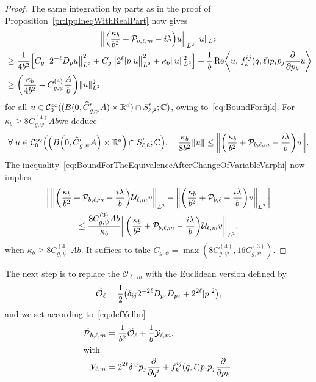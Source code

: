 \documentclass[10pt]{amsart}
\theoremstyle{definition}\newtheorem{defi}[theo]{Definition}\newtheorem{rema}[theo]{Remark}\newtheorem{exam}[theo]{Example}\newtheorem{exem}[theo]{Example}\newtheorem{nota}[theo]{Notation}
\newcommand{\C}{\mathbb{C}}
\newcommand{\R}{\mathbb{R}}
\newcommand{\clC}{\mathcal{C}}
\newcommand{\clY}{\mathcal{Y}}
\newcommand{\clO}{\mathcal{O}}
\newcommand{\clP}{\mathcal{P}}
\newcommand{\clU}{\mathcal{U}}
\DeclareMathOperator{\Ree}{Re}
\let\oldtilde\tilde
\renewcommand*{\tilde}[1]{\mathchoice{\widetilde{#1}}{\widetilde{#1}}{\oldtilde{#1}}{\oldtilde{#1}}}
\let\oldhat\hat
\renewcommand*{\hat}[1]{\mathchoice{\widehat{#1}}{\widehat{#1}}{\oldhat{#1}}{\oldhat{#1}}}
\let\oldforall\forall
\renewcommand*{\forall}{\mathrel{\oldforall}}
\let\originalleft\left
\let\originalright\right
\renewcommand{\left}{\mathopen{}\mathclose\bgroup\originalleft}
\renewcommand{\right}{\aftergroup\egroup\originalright}
\newcounter{setofstep}
\newcounter{step}[setofstep]
\begin{document}
\begin{proof}
The same integration by parts as in the proof of Proposition~\ref{pr:IppIneqWithRealPart} now gives
\begin{multline*}
\left\| \left(\frac{\kappa_{b}}{b^{2}}+\clP_{b,\ell,m} - i\lambda\right) u \right\|_{L^{2}} \|u\|_{L^{2}}\\
\begin{aligned}
&\geq \frac{1}{4b^{2}}
\left[C_g\left\|2^{-\ell}D_{p}u\right\|_{L^{2}}^{2} + C_g\left\| 2^\ell|p|u\right\|_{L^{2}}^{2} + \kappa_{b} \|u\|_{L^{2}}^2
\right]+\frac{1}{b}\Ree\left\langle u,\, f_{k}^{ij}(q,\ell)p_{i}p_{j}\frac{\partial}{\partial p_{k}} u\right\rangle\\
&\geq \left(\frac{\kappa_{b}}{4b^2}
-C_{g,\psi}^{(4)} \frac{A}{b}\right)\|u\|_{L^{2}}^2
\end{aligned}
\end{multline*}
for all $u\in \clC^{\infty}_0((B(0,\hat{C}'_{g,\psi} A)\times\R^d)\cap S'_{\ell,8};\C)$, owing to~\eqref{eq:BoundForfijk}. For $\kappa_b\geq 8C_{g,\psi}^{(4)}Ab$\linebreak we deduce
\[
\forall u\in \clC^{\infty}_0\left(\left(B\left(0,\hat{C}'_{g,\psi} A\right)\times\R^d\right)\cap S'_{\ell,8};\C\right),\quad \frac{\kappa_{b}}{8b^{2}}\|u\| \leq \left\| \left(\frac{\kappa_{b}}{b^{2}}+\clP_{b,\ell,m}-\frac{i\lambda}{b}\right)u\right\|.
\]
The inequality~\eqref{eq:BoundForTheEquivalenceAfterChangeOfVariableVarphi} now implies
\begin{multline}
\left|\,\left\| \left(\frac{\kappa_{b}}{b^{2}}+\clP_{b,\ell,m} - \frac{i\lambda}{b}\right)\clU_{\ell,m}v \right\|_{L^2} - \left\| \left(\frac{\kappa_{b}}{b^{2}} + \clP_{b,\ell} - \frac{i\lambda}{b}\right)v \right\|_{L^2}\,\right| \\
\leq \frac{8C_{g,\psi}^{(3)}Ab}{\kappa_{b}} \left\| \left(\frac{\kappa_{b}}{b^{2}} + \clP_{b,\ell,m} - \frac{i\lambda}{b}\right)\clU_{\ell,m}v \right\|_{L^2}.
\end{multline}
when $\kappa_b\geq 8C_{g,\psi}^{(4)}Ab$. It suffices to take $C_{g,\psi}=\max(8C_{g,\psi}^{(4)}, 16C_{g,\psi}^{(3)})$.
\end{proof}

The next step is to replace the $\clO_{\ell,m}$ with the Euclidean version defined by
\begin{equation}
\tilde{\clO}_{\ell}=\frac{1}{2}
\left (\delta_{ij}2^{-2\ell}D_{p_{i}}D_{p_{j}}+2^{2\ell}|p|^2\right),
\end{equation}
\pagebreak{}
\noindent and we set according to~\eqref{eq:defYellm}
\begin{align}
\tilde{\clP}_{b,\ell,m} &= \frac{1}{b^{2}} \tilde{\clO}_{\ell} + \frac{1}{b}\clY_{\ell,m} ,\label{eq:deftildePbellm}
\\
\intertext{with}
\clY_{\ell,m}&=2^{2\ell}\delta^{ij}p_{j}\frac{\partial}{\partial q^{i}} + f_{k}^{ij}(q,\ell)p_{i}p_{j}\frac{\partial}{\partial p_{k}}.\label{eq:rappYellm}
\end{align}
\end{document}
